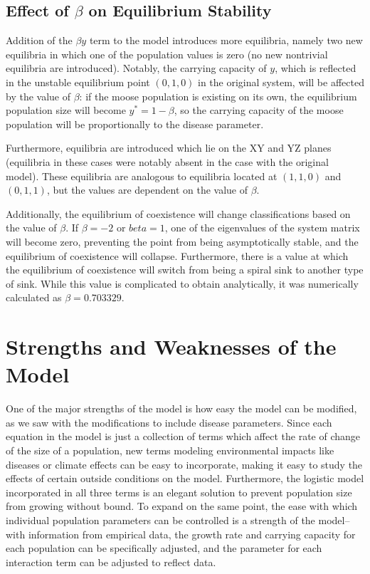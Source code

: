 \documentclass[10pt]{article}
\begin{document}
\subsection{Effect of \(\beta\) on Equilibrium Stability}
Addition of the \(\beta y\) term to the model introduces more equilibria, namely two new equilibria in which one of the population values is zero (no new nontrivial equilibria are introduced). Notably, the carrying capacity of \(y\), which is reflected in the unstable equilibrium point \((0,1,0)\) in the original system, will be affected by the value of \(\beta\): if the moose population is existing on its own, the equilibrium population size will become \(y^* = 1-\beta\), so the carrying capacity of the moose population will be proportionally to the disease parameter.

Furthermore, equilibria are introduced which lie on the XY and YZ planes (equilibria in these cases were notably absent in the case with the original model). These equilibria are analogous to equilibria located at \((1,1,0)\) and \((0,1,1)\), but the values are dependent on the value of \(\beta\).

Additionally, the equilibrium of coexistence will change classifications based on the value of \(\beta\). If \(\beta=-2\) or \(beta=1\), one of the eigenvalues of the system matrix will become zero, preventing the point from being asymptotically stable, and the equilibrium of coexistence will collapse. Furthermore, there is a value at which the equilibrium of coexistence will switch from being a spiral sink to another type of sink. While this value is complicated to obtain analytically, it was numerically calculated as \(\beta = 0.703329\).

\section{Strengths and Weaknesses of the Model}

One of the major strengths of the model is how easy the model can be modified, as we saw with the modifications to include disease parameters. Since each equation in the model is just a collection of terms which affect the rate of change of the size of a population, new terms modeling environmental impacts like diseases or climate effects can be easy to incorporate, making it easy to study the effects of certain outside conditions on the model. Furthermore, the logistic model incorporated in all three terms is an elegant solution to prevent population size from growing without bound. To expand on the same point, the ease with which individual population parameters can be controlled is a strength of the model--with information from empirical data, the growth rate and carrying capacity for each population can be specifically adjusted, and the parameter for each interaction term can be adjusted to reflect data. 
\end{document}
